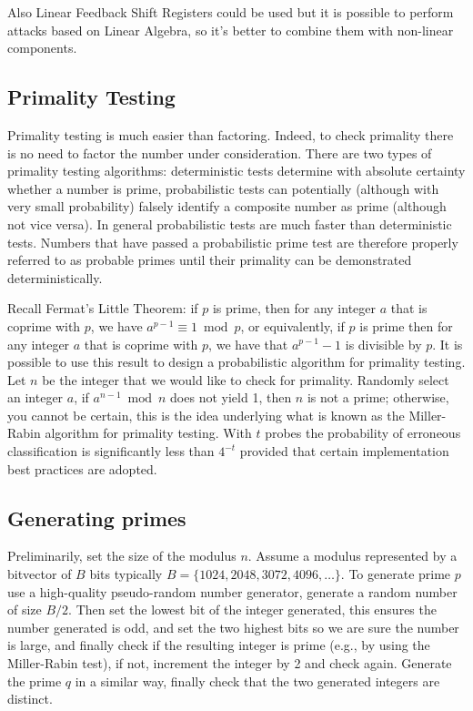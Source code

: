 Also Linear Feedback Shift Registers could be used but it is possible to perform attacks based on Linear Algebra, so it's better to combine them with non-linear components.


\subsection{Primality Testing}
Primality testing is much easier than factoring. Indeed, to check primality there is no need to factor the number under consideration.  There are two types of primality testing algorithms: deterministic tests determine with absolute certainty whether a number is prime, probabilistic tests can potentially (although with very small probability) falsely identify a composite number as prime (although not vice versa). In general probabilistic tests are much faster than deterministic tests. Numbers that have passed a probabilistic prime test are therefore properly referred to as probable primes until their primality can be demonstrated deterministically.

Recall Fermat’s Little Theorem: if $p$ is prime, then for any integer $a$ that is coprime with $p$, we have $a^{p-1} \equiv 1 \bmod p$, or equivalently,  if $p$ is prime then for any integer $a$ that is coprime with $p$, we have that $a^{p-1} - 1$ is divisible by $p$.  It is possible to use this result to design a probabilistic algorithm for primality testing. Let $n$ be the integer that we would like to check for primality. Randomly select an integer $a$, if $a^{n-1} \bmod n$ does not yield 1, then $n$ is not a prime; otherwise, you cannot be certain, this is the idea underlying what is known as the Miller-Rabin algorithm for primality testing. With $t$ probes the probability of erroneous classification is significantly less than $4^{-t}$ provided that certain implementation best practices are adopted.

\subsection{Generating primes}
Preliminarily, set the size of the modulus $n$. Assume a modulus represented by a bitvector of $B$ bits typically $B=\{1024,2048,3072,4096,\ldots\}$. To generate prime $p$ use a high-quality pseudo-random number generator, generate a random number of size $B/2$. Then set the lowest bit of the integer generated, this ensures the number generated is odd, and set the two highest bits so we are sure the number is large, and finally check if the resulting integer is prime (e.g., by using the Miller-Rabin test), if not, increment the integer by 2 and check again. Generate the prime $q$ in a similar way, finally check that the two generated integers are distinct.


